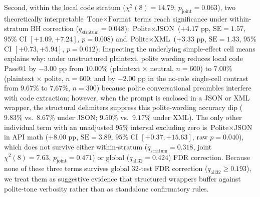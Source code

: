 \documentclass[a4paper,fleqn]{cas-sc}
\begin{document}
Second, within the local code stratum ($\chi^2(8) = 14.79$, $p_{\text{joint}} = 0.063$), two theoretically interpretable $\text{Tone} \times \text{Format}$ terms reach significance under within-stratum BH correction ($q_{\text{stratum}} = 0.048$): $\text{Polite} \times \text{JSON}$ ($+4.17$ pp, $\text{SE} = 1.57$, $95\%$ CI $[+1.09, +7.24]$, $p = 0.008$) and $\text{Polite} \times \text{XML}$ ($+3.33$ pp, $\text{SE} = 1.33$, $95\%$ CI $[+0.73, +5.94]$, $p = 0.012$). Inspecting the underlying simple-effect cell means explains why: under unstructured plaintext, polite wording reduces local code Pass@1 by $-3.00$ pp from $10.00\%$ (plaintext $\times$ neutral, $n = 600$) to $7.00\%$ (plaintext $\times$ polite, $n = 600$; and by $-2.00$ pp in the no-role single-cell contrast from $9.67\%$ to $7.67\%$, $n = 300$) because polite conversational preambles interfere with code extraction; however, when the prompt is enclosed in a JSON or XML wrapper, the structural delimiters suppress this polite-wording accuracy dip ($9.83\%$ vs.\ $8.67\%$ under JSON; $9.50\%$ vs.\ $9.17\%$ under XML). The only other individual term with an unadjusted $95\%$ interval excluding zero is $\text{Polite} \times \text{JSON}$ in API math ($+8.00$ pp, $\text{SE} = 3.89$, $95\%$ CI $[+0.37, +15.63]$, raw $p = 0.040$), which does not survive either within-stratum ($q_{\text{stratum}} = 0.318$, joint $\chi^2(8) = 7.63$, $p_{\text{joint}} = 0.471$) or global ($q_{\text{all32}} = 0.424$) FDR correction. Because none of these three terms survives global 32-test FDR correction ($q_{\text{all32}} \ge 0.193$), we treat them as suggestive evidence that structured wrappers buffer against polite-tone verbosity rather than as standalone confirmatory rules.
\end{document}
